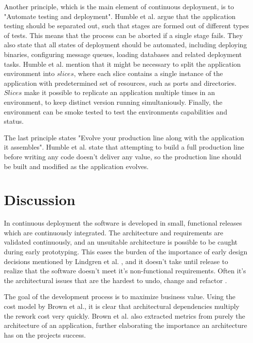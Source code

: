 \documentclass[conference]{IEEEtran}
\begin{document}
Another principle, which is the main element of continuous deployment, is to "Automate testing and deployment". Humble et al. argue that the application testing should be separated out, such that stages are formed out of different types of tests. This means that the process can be aborted if a single stage fails. They also state that all states of deployment should be automated, including deploying binaries, configuring message queues, loading databases and related deployment tasks. Humble et al. mention that it might be necessary to split the application environment into $slices$, where each slice contains a single instance of the application with predetermined set of resources, such as ports and directories. $Slices$ make it possible to replicate an application multiple times in an environment, to keep distinct version running simultaniously. Finally, the environment can be smoke tested to test the environments capabilities and status.

The last principle states "Evolve your production line along with the application it assembles". Humble et al. state that attempting to build a full production line before writing any code doesn't deliver any value, so the production line should be built and modified as the application evolves. 

\section{Discussion} %

In continuous deployment the software is developed in small, functional releases which are continuously integrated. The architecture and requirements are validated continuously, and an unsuitable architecture is possible to be caught during early prototyping. This eases the burden of the importance of early design decisions mentioned by Lindgren et al. \cite{bass2003software}, and it doesn't take until release to realize that the software doesn't meet it's non-functional requirements. Often it's the architectural issues that are the hardest to undo, change and refactor \cite{kruchten2010software}.

The goal of the development process is to maximize business value. Using the cost model \cite{brown2011analysis} by Brown et al., it is clear that architectural dependencies multiply the rework cost very quickly. Brown et al. also extracted metrics from purely the architecture of an application, further elaborating the importance an architecture has on the projects success.
\end{document}
